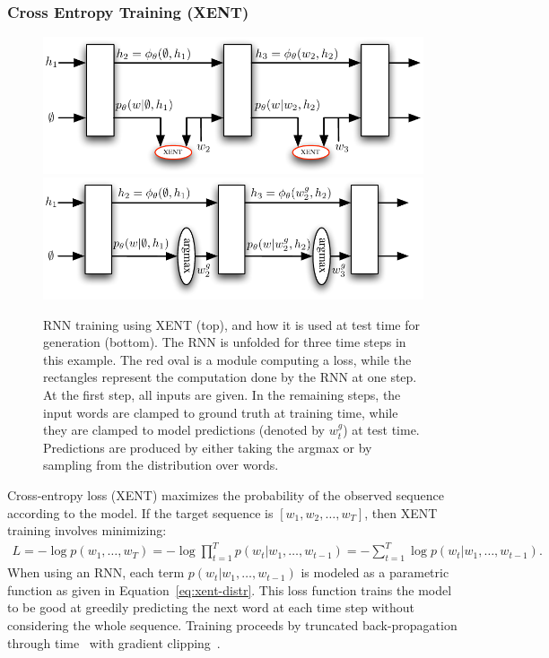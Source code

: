 \subsubsection{Cross Entropy Training (XENT)} \label{model-xent}
\begin{figure}[!t]
	   \includegraphics[width=0.65\linewidth]{xent_training.pdf}\\
	   \includegraphics[width=0.65\linewidth]{xent_generation.pdf}
  \caption{RNN training using XENT (top), and how it is used at test time for generation (bottom). The RNN is unfolded for three time steps in this example. The red oval is a module computing a loss, while the rectangles represent the computation done by the RNN at one step. At the first step, all inputs are given. In the remaining steps, the input words are clamped to ground truth at training time, while they are clamped to model predictions (denoted by $w^g_t$) at test time. Predictions are produced by either taking the argmax or by sampling from the distribution over words. 
  }
  \label{fig:xent}
\end{figure}
Cross-entropy loss (XENT) maximizes the probability of the observed sequence according to the model.
If the target sequence is $[w_1, w_2, \dots, w_T]$, then XENT training involves minimizing: 
\begin{align}
L =	- \log p(w_1, \ldots, w_T) = - \log \prod_{t=1}^T p(w_t | w_1, \ldots, w_{t-1}) = - \sum_{t=1}^T \log p(w_t | w_1, \ldots, w_{t-1}).  \label{eq:xenty}
\end{align}
When using an RNN, each term $p(w_t | w_1, \ldots, w_{t-1})$ is modeled as a parametric function as given in Equation~\eqref{eq:xent-distr}. This loss function trains the model to be good at greedily predicting the next word at each time step without considering the whole sequence. Training proceeds by truncated back-propagation through time~\citep{bptt} with gradient clipping~\citep{mikolov-2010}.

